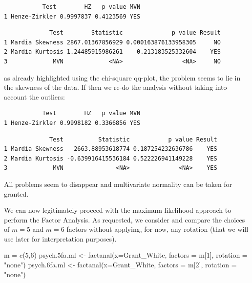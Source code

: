 \documentclass[
  letterpaper,
  DIV=11,
  numbers=noendperiod]{scrartcl}
\newenvironment{Shaded}{\begin{snugshade}}{\end{snugshade}}
\newcommand{\AttributeTok}[1]{\textcolor[rgb]{0.40,0.45,0.13}{#1}}
\newcommand{\DecValTok}[1]{\textcolor[rgb]{0.68,0.00,0.00}{#1}}
\newcommand{\FloatTok}[1]{\textcolor[rgb]{0.68,0.00,0.00}{#1}}
\newcommand{\FunctionTok}[1]{\textcolor[rgb]{0.28,0.35,0.67}{#1}}
\newcommand{\NormalTok}[1]{\textcolor[rgb]{0.00,0.23,0.31}{#1}}
\newcommand{\OtherTok}[1]{\textcolor[rgb]{0.00,0.23,0.31}{#1}}
\newcommand{\StringTok}[1]{\textcolor[rgb]{0.13,0.47,0.30}{#1}}
\begin{document}
\begin{verbatim}
           Test        HZ   p value MVN
1 Henze-Zirkler 0.9997837 0.4123569 YES
\end{verbatim}

\begin{verbatim}
             Test        Statistic              p value Result
1 Mardia Skewness 2867.01367856929 0.000163876133958305     NO
2 Mardia Kurtosis 1.24485915986261    0.213183525332604    YES
3             MVN             <NA>                 <NA>     NO
\end{verbatim}

as already highlighted using the chi-square qq-plot, the problem seems
to lie in the skewness of the data. If then we re-do the analysis
without taking into account the outliers:

\begin{verbatim}
           Test        HZ   p value MVN
1 Henze-Zirkler 0.9998182 0.3366856 YES
\end{verbatim}

\begin{verbatim}
             Test          Statistic           p value Result
1 Mardia Skewness   2663.88953618774 0.187254232636786    YES
2 Mardia Kurtosis -0.639916415536184 0.522226941149228    YES
3             MVN               <NA>              <NA>    YES
\end{verbatim}

All problems seem to disappear and multivariate normality can be taken
for granted.

We can now legitimately proceed with the maximum likelihood approach to
perform the Factor Analysis. As requested, we consider and compare the
choices of \(m=5\) and \(m=6\) factors without applying, for now, any
rotation (that we will use later for interpretation purposes).

\begin{Shaded}
\begin{Highlighting}[]
\NormalTok{m }\OtherTok{=} \FunctionTok{c}\NormalTok{(}\DecValTok{5}\NormalTok{,}\DecValTok{6}\NormalTok{)}
\NormalTok{psych}\FloatTok{.5}\NormalTok{fa.ml }\OtherTok{\textless{}{-}} \FunctionTok{factanal}\NormalTok{(}\AttributeTok{x=}\NormalTok{Grant\_White, }\AttributeTok{factors =}\NormalTok{ m[}\DecValTok{1}\NormalTok{], }\AttributeTok{rotation =} \StringTok{"none"}\NormalTok{)}
\NormalTok{psych}\FloatTok{.6}\NormalTok{fa.ml }\OtherTok{\textless{}{-}} \FunctionTok{factanal}\NormalTok{(}\AttributeTok{x=}\NormalTok{Grant\_White, }\AttributeTok{factors =}\NormalTok{ m[}\DecValTok{2}\NormalTok{], }\AttributeTok{rotation =} \StringTok{"none"}\NormalTok{)}
\end{Highlighting}
\end{Shaded}
\end{document}
